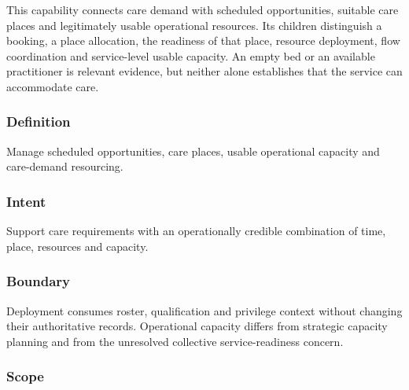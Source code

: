 This capability connects care demand with scheduled opportunities, suitable care places and legitimately usable operational resources. Its children distinguish a booking, a place allocation, the readiness of that place, resource deployment, flow coordination and service-level usable capacity. An empty bed or an available practitioner is relevant evidence, but neither alone establishes that the service can accommodate care.

\subsubsection*{Definition}

Manage scheduled opportunities, care places, usable operational capacity and care-demand resourcing.

\subsubsection*{Intent}

Support care requirements with an operationally credible combination of time, place, resources and capacity.

\subsubsection*{Boundary}

Deployment consumes roster, qualification and privilege context without changing their authoritative records. Operational capacity differs from strategic capacity planning and from the unresolved collective service-readiness concern.

\subsubsection*{Scope}
